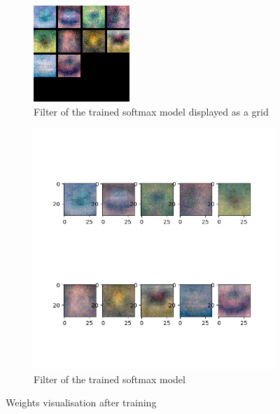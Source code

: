 \begin{figure}[h!]
  \begin{center}
    \begin{subfigure}[t]{0.49\linewidth}
      \centering
      \includegraphics[width=\linewidth]{../code/assignment/2_pytorch/softmax_gridfilt.png}
        \caption{Filter of the trained softmax model displayed as a grid}
    \end{subfigure}
    \begin{subfigure}[t]{0.49\linewidth}
      \centering
      \includegraphics[width=\linewidth]{../code/assignment/2_pytorch/softmax_filt.png}
        \caption{Filter of the trained softmax model}
    \end{subfigure}
    \caption{Weights visualisation after training}
  \end{center}
\end{figure}
